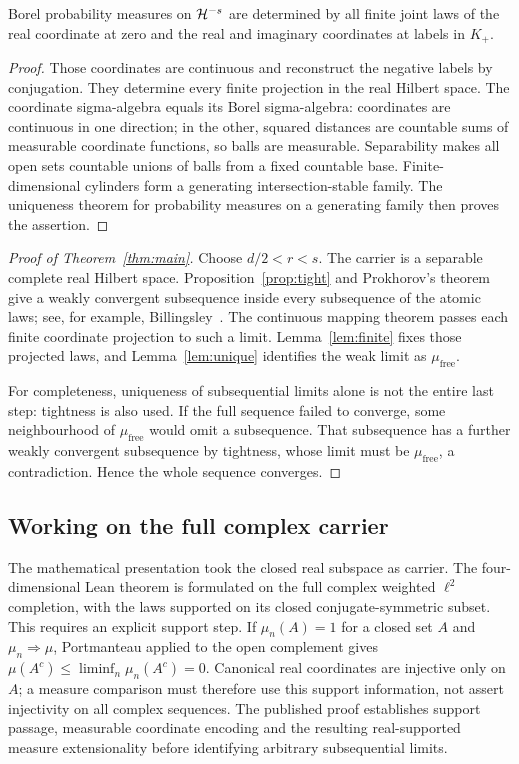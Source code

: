 \begin{lemma}\label{lem:unique}
Borel probability measures on $\mathcal H^{-s}$ are determined by all finite joint
laws of the real coordinate at zero and the real and imaginary coordinates
at labels in $K_+$.
\end{lemma}
\begin{proof}
Those coordinates are continuous and reconstruct the negative labels by
conjugation. They determine every finite projection in the real Hilbert space.
The coordinate sigma-algebra equals its Borel sigma-algebra: coordinates are
continuous in one direction; in the other, squared distances are countable
sums of measurable coordinate functions, so balls are measurable. Separability
makes all open sets countable unions of balls from a fixed countable base.
Finite-dimensional cylinders form a generating intersection-stable family.
The uniqueness theorem for probability measures on a generating family then
proves the assertion.
\end{proof}

\begin{proof}[Proof of Theorem~\ref{thm:main}]
Choose $d/2<r<s$. The carrier is a separable complete real Hilbert space.
Proposition~\ref{prop:tight} and Prokhorov's theorem give a weakly convergent
subsequence inside every subsequence of the atomic laws; see, for example,
Billingsley~\cite{Billingsley}. The continuous mapping theorem passes each
finite coordinate projection to such a limit. Lemma~\ref{lem:finite} fixes
those projected laws, and Lemma~\ref{lem:unique} identifies the weak limit as
$\mu_{\mathrm{free}}$.

For completeness, uniqueness of subsequential limits alone is not the entire
last step: tightness is also used. If the full sequence failed to converge,
some neighbourhood of $\mu_{\mathrm{free}}$ would omit a subsequence. That
subsequence has a further weakly convergent subsequence by tightness, whose
limit must be $\mu_{\mathrm{free}}$, a contradiction. Hence the whole sequence
converges.
\end{proof}

\subsection{Working on the full complex carrier}
The mathematical presentation took the closed real subspace as carrier.
The four-dimensional Lean theorem is formulated on the full complex weighted
$\ell^2$ completion, with the laws supported on its closed conjugate-symmetric
subset. This requires an explicit support step. If $\mu_n(A)=1$ for a closed
set $A$ and $\mu_n\Rightarrow\mu$, Portmanteau applied to the open complement
gives $\mu(A^c)\leq\liminf_n\mu_n(A^c)=0$.
Canonical real coordinates are injective only on $A$; a measure comparison
must therefore use this support information, not assert injectivity on all
complex sequences. The published proof establishes support passage,
measurable coordinate encoding and the resulting real-supported measure
extensionality before identifying arbitrary subsequential limits.

